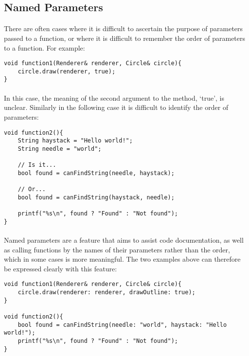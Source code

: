 \documentclass[12pt,twoside,notitlepage]{report}
\begin{document}
\subsection{Named Parameters}

\paragraph{}
There are often cases where it is difficult to ascertain the purpose of parameters passed to a function, or where it is difficult to remember the order of parameters to a function. For example:

\small{
\begin{verbatim}
void function1(Renderer& renderer, Circle& circle){
    circle.draw(renderer, true);
}
\end{verbatim}
}

\paragraph{}
In this case, the meaning of the second argument to the method, `true', is unclear. Similarly in the following case it is difficult to identify the order of parameters:

\small{
\begin{verbatim}
void function2(){
    String haystack = "Hello world!";
    String needle = "world";
    
    // Is it...
    bool found = canFindString(needle, haystack);
    
    // Or...
    bool found = canFindString(haystack, needle);
    
    printf("%s\n", found ? "Found" : "Not found");
}
\end{verbatim}
}

\paragraph{}
Named parameters are a feature that aims to assist code documentation, as well as calling functions by the names of their parameters rather than the order, which in some cases is more meaningful. The two examples above can therefore be expressed clearly with this feature:

\small{
\begin{verbatim}
void function1(Renderer& renderer, Circle& circle){
    circle.draw(renderer: renderer, drawOutline: true);
}

void function2(){
    bool found = canFindString(needle: "world", haystack: "Hello world!");
    printf("%s\n", found ? "Found" : "Not found");
}
\end{verbatim}
}
\end{document}
